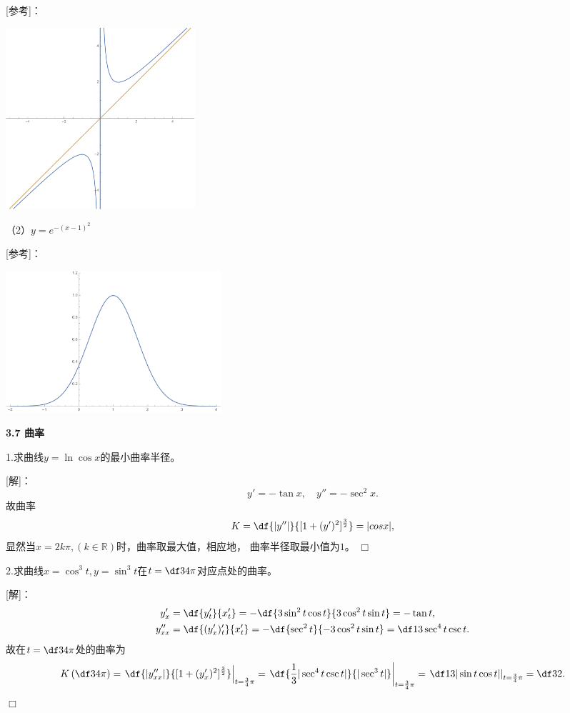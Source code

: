 [参考]：
\begin{center}
	\includegraphics[width=7cm]{./images/ch3/x1x.pdf}
\end{center}

（2）$y=e^{-(x-1)^2}$

[参考]：
\begin{center}
	\includegraphics[width=8cm]{./images/ch3/e-2x.pdf}
\end{center}

\begin{center}
	\bf 3.7 曲率
\end{center}

1.求曲线$y=\ln\cos x$的最小曲率半径。

[解]：
$$y'=-\tan x,\quad y''=-\sec^2x.$$
故曲率
$$K=\df{|y''|}{[1+(y')^2]^{\frac32}}=|cos x|,$$
显然当$x=2k\pi,(k\in\mathbb{R})$时，曲率取最大值，相应地，
曲率半径取最小值为$1$。
\hfill$\Box$

\bigskip

2.求曲线$x=\cos^3t,y=\sin^3t$在$t=\df34\pi$对应点处的曲率。

[解]：
\begin{align*}
	y'_x&=\df{y'_t}{x'_t}=-\df{3\sin^2t\cos t}{3\cos^2t\sin t}
	=-\tan t,\\
	y''_{xx}&=\df{(y'_x)'_t}{x'_t}
	=-\df{\sec^2t}{-3\cos^2t\sin t}=\df13\sec^4t\csc t.
\end{align*}
故在$t=\df34\pi$处的曲率为
$$K\left(\df34\pi\right)=\left.\df{|y''_{xx}|}{[1+(y'_x)^2]^{\frac32}}\right|_{t=\frac34\pi}
=\left.\df{\frac13|\sec^4t\csc t|}{|\sec^3t|}\right|_{t=\frac34\pi}
=\left.\df1{3|\sin t\cos t|}\right|_{t=\frac34\pi}
=\df32.$$
\hfill$\Box$

